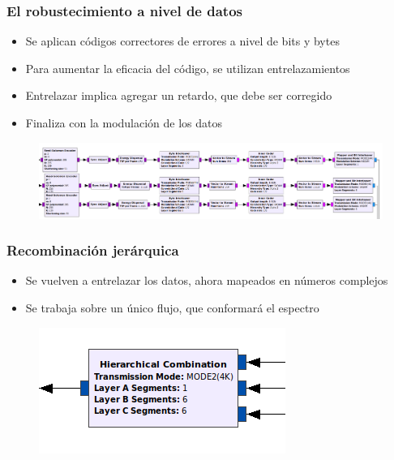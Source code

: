 \begin{frame}
\frametitle{El robustecimiento a nivel de datos}
\begin{itemize}	
	\item { Se aplican códigos correctores de errores a nivel de bits y bytes}
	\item {	Para aumentar la eficacia del código, se utilizan entrelazamientos}
	\item { Entrelazar implica agregar un retardo, que debe ser corregido }
	\item { Finaliza con la modulación de los datos}
\end{itemize}
\begin{figure}
	\includegraphics[scale=0.22]{rob_datos}
\end{figure}
\end{frame}
\begin{frame}
\frametitle{Recombinación jerárquica}
\begin{itemize}	
	\item { Se vuelven a entrelazar los datos, ahora mapeados en números complejos}
	\item {	Se trabaja sobre un único flujo, que conformará el espectro}
\end{itemize}
\begin{figure}
	\includegraphics[scale=0.55]{h_conv}
\end{figure}
\end{frame}
